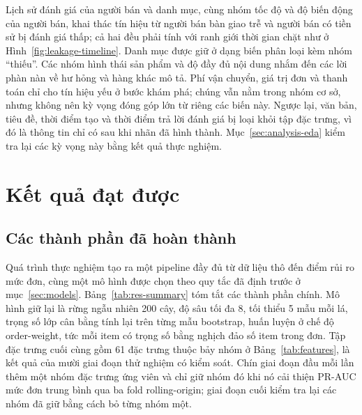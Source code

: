Lịch sử đánh giá của người bán và danh mục, cùng nhóm tốc độ và độ biến động của người bán, khai thác tín hiệu từ người bán bàn giao trễ và người bán có tiền sử bị đánh giá thấp; cả hai đều phải tính với ranh giới thời gian chặt như ở Hình~\ref{fig:leakage-timeline}. Danh mục được giữ ở dạng biến phân loại kèm nhóm ``thiếu''. Các nhóm hình thái sản phẩm và độ đầy đủ nội dung nhắm đến các lời phàn nàn về hư hỏng và hàng khác mô tả. Phí vận chuyển, giá trị đơn và thanh toán chỉ cho tín hiệu yếu ở bước khám phá; chúng vẫn nằm trong nhóm cơ sở, nhưng không nên kỳ vọng đóng góp lớn từ riêng các biến này. Ngược lại, văn bản, tiêu đề, thời điểm tạo và thời điểm trả lời đánh giá bị loại khỏi tập đặc trưng, vì đó là thông tin chỉ có sau khi nhãn đã hình thành. Mục~\ref{sec:analysis-eda} kiểm tra lại các kỳ vọng này bằng kết quả thực nghiệm.

\section{Kết quả đạt được}\label{sec:results}

\subsection{Các thành phần đã hoàn thành}\label{subsec:res-summary}

Quá trình thực nghiệm tạo ra một pipeline đầy đủ từ dữ liệu thô đến điểm rủi ro mức đơn, cùng một mô hình được chọn theo quy tắc đã định trước ở mục~\ref{sec:models}. Bảng~\ref{tab:res-summary} tóm tắt các thành phần chính. Mô hình giữ lại là rừng ngẫu nhiên 200 cây, độ sâu tối đa 8, tối thiểu 5 mẫu mỗi lá, trọng số lớp cân bằng tính lại trên từng mẫu bootstrap, huấn luyện ở chế độ order-weight, tức mỗi item có trọng số bằng nghịch đảo số item trong đơn. Tập đặc trưng cuối cùng gồm 61 đặc trưng thuộc bảy nhóm ở Bảng~\ref{tab:features}, là kết quả của mười giai đoạn thử nghiệm có kiểm soát. Chín giai đoạn đầu mỗi lần thêm một nhóm đặc trưng ứng viên và chỉ giữ nhóm đó khi nó cải thiện PR-AUC mức đơn trung bình qua ba fold rolling-origin; giai đoạn cuối kiểm tra lại các nhóm đã giữ bằng cách bỏ từng nhóm một.

